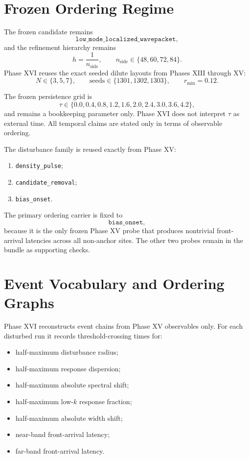 \documentclass[11pt]{article}
\begin{document}
\section{Frozen Ordering Regime}

The frozen candidate remains
\[
\texttt{low\_mode\_localized\_wavepacket},
\]
and the refinement hierarchy remains
\[
h = \frac{1}{n_{\mathrm{side}}},
\qquad
n_{\mathrm{side}} \in \{48,60,72,84\}.
\]
Phase XVI reuses the exact seeded dilute layouts from Phases XIII through XV:
\[
N \in \{3,5,7\},
\qquad
\text{seeds} \in \{1301,1302,1303\},
\qquad
r_{\min}=0.12.
\]

The frozen persistence grid is
\[
\tau \in \{0.0,0.4,0.8,1.2,1.6,2.0,2.4,3.0,3.6,4.2\},
\]
and remains a bookkeeping parameter only. Phase XVI does not interpret $\tau$ as external time. All temporal claims are stated only in terms of observable ordering.

The disturbance family is reused exactly from Phase XV:
\begin{enumerate}
\item \texttt{density\_pulse};
\item \texttt{candidate\_removal};
\item \texttt{bias\_onset}.
\end{enumerate}

The primary ordering carrier is fixed to
\[
\texttt{bias\_onset},
\]
because it is the only frozen Phase XV probe that produces nontrivial front-arrival latencies across all non-anchor sites. The other two probes remain in the bundle as supporting checks.

\section{Event Vocabulary and Ordering Graphs}

Phase XVI reconstructs event chains from Phase XV observables only. For each disturbed run it records threshold-crossing times for:
\begin{itemize}
\item half-maximum disturbance radius;
\item half-maximum response dispersion;
\item half-maximum absolute spectral shift;
\item half-maximum low-$k$ response fraction;
\item half-maximum absolute width shift;
\item near-band front-arrival latency;
\item far-band front-arrival latency.
\end{itemize}
\end{document}
